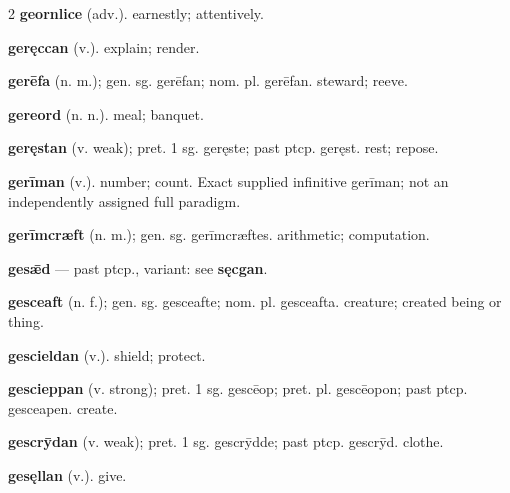 \begin{multicols*}{2}
\textbf{geornlice} (adv.). earnestly; attentively.\par
\textbf{geręccan} (v.). explain; render.\par
\textbf{gerēfa} (n. m.); gen. sg. gerēfan; nom. pl. gerēfan. steward; reeve.\par
\textbf{gereord} (n. n.). meal; banquet.\par
\textbf{geręstan} (v. weak); pret. 1 sg. geręste; past ptcp. geręst. rest; repose.\par
\textbf{gerīman} (v.). number; count. Exact supplied infinitive gerīman; not an independently assigned full paradigm.\par
\textbf{gerīmcræft} (n. m.); gen. sg. gerīmcræftes. arithmetic; computation.\par
\textbf{gesǣd} — past ptcp., variant: see \textbf{sęcgan}.\par
\textbf{gesceaft} (n. f.); gen. sg. gesceafte; nom. pl. gesceafta. creature; created being or thing.\par
\textbf{gescieldan} (v.). shield; protect.\par
\textbf{gescieppan} (v. strong); pret. 1 sg. gescēop; pret. pl. gescēopon; past ptcp. gesceapen. create.\par
\textbf{gescrȳdan} (v. weak); pret. 1 sg. gescrȳdde; past ptcp. gescrȳd. clothe.\par
\textbf{gesęllan} (v.). give.\par

\end{multicols*}
